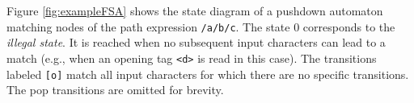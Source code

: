 Figure \ref{fig:exampleFSA} shows the state diagram of a pushdown automaton
matching nodes of the path expression \verb;/a/b/c;. The state $0$ corresponds
to the \emph{illegal state}. It is reached when no subsequent input characters
can lead to a match (e.g., when an opening tag \verb;<d>; is read in this case).
The transitions labeled \verb;[o]; match all input characters for which there
are no specific transitions. The pop transitions are omitted for brevity.






